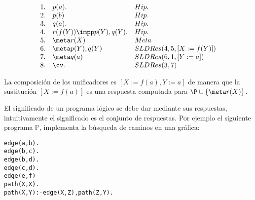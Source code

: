 \documentclass[11pt,letterpaper]{article}
\begin{document}
\begin{small}
\begin{minipage}{.5\textwidth}
 \centering
 \[
 \begin{array}{rll}
  1. & p(a). & Hip. \\
  2. & p(b) & Hip. \\
  3. & q(a). & Hip. \\ 
  4. & r(f(Y))\impp p(Y),q(Y). & Hip.\\
  5. & \meta r(X) &Meta \\
  6. & \meta p(Y),q(Y) & SLDRes(4,5,[X:=f(Y)]) \\
  7. & \meta q(a)  & SLDRes(6,1,[Y:=a])\\
  8. & \cv. & SLDRes(3,7) 
 \end{array}
\]
\end{minipage}
\begin{minipage}{.5\textwidth}
\centering
\end{minipage}
\end{small}

La composici\'on de los unificadores es $[X:=f(a),Y:=a]$ de manera que 
la sustituci\'on $[X:=f(a)]$ es una respuesta computada para
$\P\cup\{\meta r(X)\}$.
\eeje

El significado de un programa l\'ogico se debe dar mediante sus respuestas, 
intuitivamente el significado es el conjunto de respuestas. Por ejemplo el 
siguiente programa $\mathbb{P}$, implementa la b\'usqueda de caminos en una 
gr\'afica:

\begin{alltt}
edge(a,b).
edge(b,c).
edge(b,d).
edge(c,d).
edge(e,f)
path(X,X).
path(X,Y) :- edge(X,Z),path(Z,Y).
\end{alltt}
\end{document}
